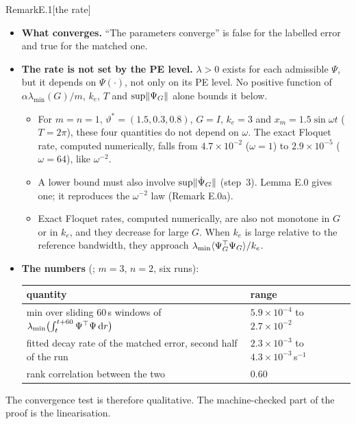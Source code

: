 \begin{rmk}{Remark}{E.1}[the rate]\mbox{}
\begin{itemize}
  \item \textbf{What converges.} ``The parameters converge'' is false for the labelled error and true for the matched
    one.
  \item \textbf{The rate is not set by the PE level.} $\lambda>0$ exists for each admissible $\Psi$, but it depends
    on $\Psi(\cdot)$, not only on its PE level. No positive function of $\alpha\lambda_{\min}(G)/m$, $k_e$, $T$ and
    $\sup\lVert \Psi_G\rVert$ alone bounds it below.
    \begin{itemize}
      \item For $m=n=1$, $\vartheta^*=(1.5,0.3,0.8)$, $G=I$, $k_e=3$ and $x_m=1.5\sin\omega t$ ($T=2\pi$), these four
        quantities do not depend on $\omega$. The exact Floquet rate, computed numerically, falls from
        $4.7\times10^{-2}$ ($\omega=1$) to $2.9\times10^{-5}$ ($\omega=64$), like $\omega^{-2}$.
      \item A lower bound must also involve $\sup\lVert \dot\Psi_G\rVert$ (step~3). Lemma E.0 gives one; it reproduces the
        $\omega^{-2}$ law (Remark E.0a).
      \item Exact Floquet rates, computed numerically, are also not monotone in $G$ or in $k_e$, and they decrease for
        large $G$. When $k_e$ is large relative to the reference bandwidth, they approach
        $\lambda_{\min}\langle\Psi_G^\top\Psi_G\rangle/k_e$.
    \end{itemize}
  \item \textbf{The numbers} (; $m=3$, $n=2$, six runs):
    \begin{center}
      \small
      \begin{tabularx}{0.9\linewidth}{Yl}
        \toprule
        quantity & range\\
        \midrule
        min over sliding $60$\,s windows of $\lambda_{\min}\bigl(\int_t^{t+60}\Psi^\top\Psi\,\mathrm{d} r\bigr)$
          & $5.9\times10^{-4}$ to $2.7\times10^{-2}$\\
        fitted decay rate of the matched error, second half of the run
          & $2.3\times10^{-3}$ to $4.3\times10^{-3}$\,s$^{-1}$\\
        rank correlation between the two & $0.60$\\
        \bottomrule
      \end{tabularx}
    \end{center}
\end{itemize}
The convergence test is therefore qualitative. The machine-checked part of the proof is the linearisation.
\end{rmk}

